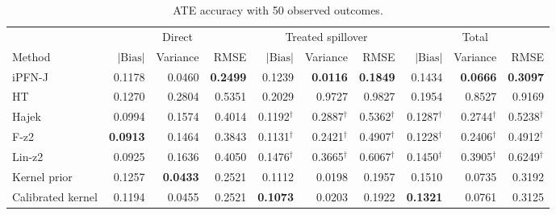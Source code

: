 \begin{table}[tb]
\centering
\caption{ATE accuracy with 50 observed outcomes.}
\begingroup\footnotesize
\setlength{\tabcolsep}{3pt}
\begin{tabular*}{\linewidth}{@{\extracolsep{\fill}}l*{9}{r}@{}}
\toprule
&\multicolumn{3}{c}{Direct}&\multicolumn{3}{c}{Treated spillover}&\multicolumn{3}{c}{Total}\\
\cmidrule(lr){2-4}\cmidrule(lr){5-7}\cmidrule(lr){8-10}
Method&$|\mathrm{Bias}|$&Variance&RMSE&$|\mathrm{Bias}|$&Variance&RMSE&$|\mathrm{Bias}|$&Variance&RMSE\\
\midrule
iPFN-J & \cellcolor{blue!7}0.1178 & \cellcolor{blue!11}0.0460 & \cellcolor{blue!24}\textbf{0.2499} & \cellcolor{blue!11}0.1239 & \cellcolor{blue!24}\textbf{0.0116} & \cellcolor{blue!24}\textbf{0.1849} & \cellcolor{blue!17}0.1434 & \cellcolor{blue!24}\textbf{0.0666} & \cellcolor{blue!24}\textbf{0.3097} \\
HT & \cellcolor{blue!1}0.1270 & \cellcolor{blue!1}0.2804 & \cellcolor{blue!1}0.5351 & \cellcolor{blue!7}0.2029 & \cellcolor{blue!7}0.9727 & \cellcolor{blue!7}0.9827 & \cellcolor{blue!7}0.1954 & \cellcolor{blue!7}0.8527 & \cellcolor{blue!7}0.9169 \\
Hajek & \cellcolor{blue!11}0.0994 & \cellcolor{blue!4}0.1574 & \cellcolor{blue!4}0.4014 & 0.1192$^{\dagger}$ & 0.2887$^{\dagger}$ & 0.5362$^{\dagger}$ & 0.1287$^{\dagger}$ & 0.2744$^{\dagger}$ & 0.5238$^{\dagger}$ \\
F-z2 & \cellcolor{blue!24}\textbf{0.0913} & \cellcolor{blue!7}0.1464 & \cellcolor{blue!7}0.3843 & 0.1131$^{\dagger}$ & 0.2421$^{\dagger}$ & 0.4907$^{\dagger}$ & 0.1228$^{\dagger}$ & 0.2406$^{\dagger}$ & 0.4912$^{\dagger}$ \\
Lin-z2 & \cellcolor{blue!17}0.0925 & \cellcolor{blue!2}0.1636 & \cellcolor{blue!2}0.4050 & 0.1476$^{\dagger}$ & 0.3665$^{\dagger}$ & 0.6067$^{\dagger}$ & 0.1450$^{\dagger}$ & 0.3905$^{\dagger}$ & 0.6249$^{\dagger}$ \\
Kernel prior & \cellcolor{blue!2}0.1257 & \cellcolor{blue!24}\textbf{0.0433} & \cellcolor{blue!11}0.2521 & \cellcolor{blue!17}0.1112 & \cellcolor{blue!17}0.0198 & \cellcolor{blue!11}0.1957 & \cellcolor{blue!11}0.1510 & \cellcolor{blue!17}0.0735 & \cellcolor{blue!11}0.3192 \\
Calibrated kernel & \cellcolor{blue!4}0.1194 & \cellcolor{blue!17}0.0455 & \cellcolor{blue!17}0.2521 & \cellcolor{blue!24}\textbf{0.1073} & \cellcolor{blue!11}0.0203 & \cellcolor{blue!17}0.1922 & \cellcolor{blue!24}\textbf{0.1321} & \cellcolor{blue!11}0.0761 & \cellcolor{blue!17}0.3125 \\

\end{tabular*}
\end{table}
